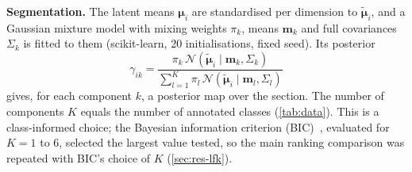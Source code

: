 \textbf{Segmentation.} The latent means $\boldsymbol{\mu}_i$ are standardised
per dimension to $\tilde{\boldsymbol{\mu}}_i$, and a Gaussian mixture model
with mixing weights $\pi_k$, means $\mathbf{m}_k$ and full covariances
$\Sigma_k$ is fitted to them (scikit-learn, 20 initialisations, fixed seed). Its posterior
\begin{equation}
\gamma_{ik}=\frac{\pi_k\,\mathcal{N}(\tilde{\boldsymbol{\mu}}_i\mid\mathbf{m}_k,\Sigma_k)}
{\sum_{l=1}^{K}\pi_l\,\mathcal{N}(\tilde{\boldsymbol{\mu}}_i\mid\mathbf{m}_l,\Sigma_l)}
\end{equation}
gives, for each component $k$, a posterior map over the section. The number of
components $K$ equals the number of annotated classes (\cref{tab:data}). This
is a class-informed choice; the Bayesian information criterion
(BIC)~\citep{schwarz1978estimating}, evaluated for $K=1$ to 6, selected the largest value
tested, so the main ranking comparison was repeated with
BIC's choice of $K$ (\cref{sec:res-lfk}).

